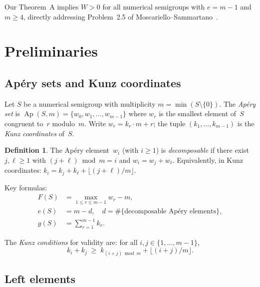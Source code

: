 \documentclass[11pt,a4paper]{amsart}
\theoremstyle{definition}
\newtheorem{definition}[theorem]{Definition}
\theoremstyle{remark}
\begin{document}
Our Theorem~A implies $W > 0$ for all numerical semigroups with
$e = m-1$ and $m \ge 4$, directly addressing Problem~2.5 of
Moscariello--Sammartano~\cite{moscariello2020}.

\section{Preliminaries}\label{sec:prelim}

\subsection{Ap\'ery sets and Kunz coordinates}

Let $S$ be a numerical semigroup with multiplicity $m = \min(S\setminus\{0\})$.
The \emph{Ap\'ery set} is
$\operatorname{Ap}(S,m) = \{w_0, w_1, \dots, w_{m-1}\}$
where $w_r$ is the smallest element of~$S$ congruent to~$r$ modulo~$m$.
Write $w_r = k_r\cdot m + r$; the tuple $(k_1,\dots,k_{m-1})$ is the
\emph{Kunz coordinates} of~$S$.

\begin{definition}
The Ap\'ery element~$w_i$ (with $i \ge 1$) is \emph{decomposable} if
there exist $j, \ell \ge 1$ with $(j+\ell) \bmod m = i$ and
$w_i = w_j + w_\ell$.  Equivalently, in Kunz coordinates:
$k_i = k_j + k_\ell + \lfloor(j+\ell)/m\rfloor$.
\end{definition}

Key formulas:
\begin{align}
  F(S) &= \max_{1 \le r \le m-1} w_r - m, \label{eq:frob}\\
  e(S) &= m - d, \quad d = \#\{\text{decomposable Ap\'ery elements}\},
    \label{eq:embed}\\
  g(S) &= \sum_{r=1}^{m-1} k_r. \label{eq:genus}
\end{align}

The \emph{Kunz conditions} for validity are: for all $i,j \in \{1,\dots,m-1\}$,
\begin{equation}\label{eq:kunz}
  k_i + k_j \;\ge\; k_{(i+j)\bmod m} + \lfloor(i+j)/m\rfloor.
\end{equation}

\subsection{Left elements}
\end{document}
